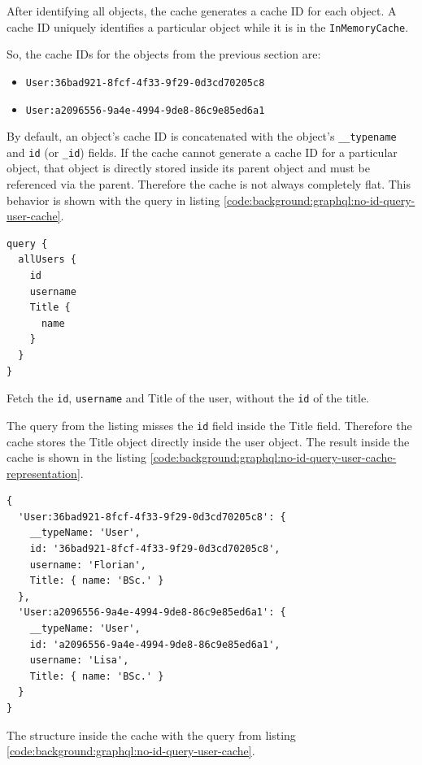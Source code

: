 After identifying all objects, the cache generates a cache ID for each object. A cache ID uniquely identifies a particular object while it is in the \texttt{InMemoryCache}.

\noindent So, the cache IDs for the objects from the previous section are:

\begin{itemize}
    \item \texttt{User:36bad921-8fcf-4f33-9f29-0d3cd70205c8}
    \item \texttt{User:a2096556-9a4e-4994-9de8-86c9e85ed6a1}
\end{itemize}

\noindent By default, an object's cache ID is concatenated with the object's \texttt{\_\_typename} and \texttt{id} (or \texttt{\_id}) fields. If the cache cannot generate a cache ID for a particular object, that object is directly stored inside its parent object and must be referenced via the parent. Therefore the cache is not always completely flat. This behavior is shown with the query in listing \ref{code:background:graphql:no-id-query-user-cache}. 

\ifshowListings
\begin{listing}[H]
    \begin{verbatim}
query {
  allUsers {
    id
    username
    Title {
      name
    }
  }
}
    \end{verbatim}
    \caption{Fetch the \texttt{id}, \texttt{username} and Title of the user, without the \texttt{id} of the title.}\label{code:background:graphql:no-id-query-user-cache}
\end{listing}
\fi

\noindent The query from the listing misses the \texttt{id} field inside the Title field. Therefore the cache stores the Title object directly inside the user object. The result inside the cache is shown in the listing
\ref{code:background:graphql:no-id-query-user-cache-representation}. 

\ifshowListings
\begin{listing}[H]
    \begin{verbatim}
{
  'User:36bad921-8fcf-4f33-9f29-0d3cd70205c8': {
    __typeName: 'User',
    id: '36bad921-8fcf-4f33-9f29-0d3cd70205c8',
    username: 'Florian',
    Title: { name: 'BSc.' }
  },
  'User:a2096556-9a4e-4994-9de8-86c9e85ed6a1': {
    __typeName: 'User',
    id: 'a2096556-9a4e-4994-9de8-86c9e85ed6a1',
    username: 'Lisa',
    Title: { name: 'BSc.' }
  }
}
    \end{verbatim}
    \caption{The structure inside the cache with the query from listing \ref{code:background:graphql:no-id-query-user-cache}.}\label{code:background:graphql:no-id-query-user-cache-representation}
\end{listing}
\fi

